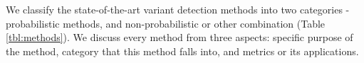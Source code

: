 \documentclass[11pt,reqno]{amsart}
\begin{document}
We classify the state-of-the-art variant detection methods into two categories - probabilistic methods, and non-probabilistic or other combination (Table \ref{tbl:methods}).
We discuss every method from three aspects: specific purpose of the method, category that this method falls into, and metrics or its applications.


\end{document}
